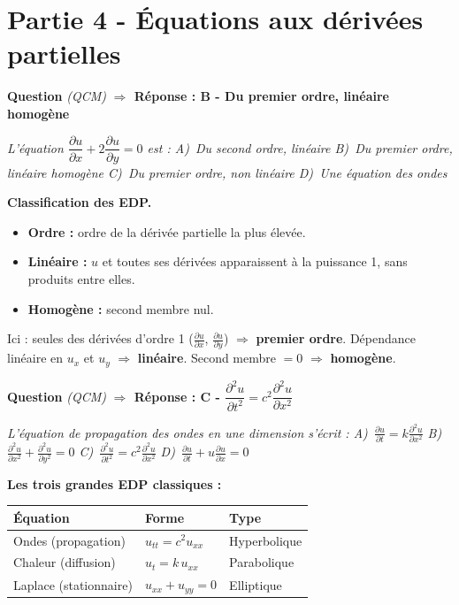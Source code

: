 \documentclass[11pt,a4paper]{article}
\newcounter{qnum}
\newcommand{\qtitre}[2]{%
  \stepcounter{qnum}%
  \medskip\noindent
  \textbf{\color{bleutexte}Question \theqnum}\enspace
  \textit{(#1)}\enspace
  \textcolor{vertok}{\textbf{$\Rightarrow$ Réponse : #2}}
  \par\smallskip
}
\newcommand{\qenonce}[1]{%
  \begin{mdframed}[backgroundcolor=grisbox, linewidth=0pt,
    innerleftmargin=8pt, innerrightmargin=8pt,
    innertopmargin=5pt, innerbottommargin=5pt,
    skipabove=2pt, skipbelow=4pt]
  \small\textit{#1}
  \end{mdframed}
}
\begin{document}
\section{Partie 4 - Équations aux dérivées partielles}

\qtitre{QCM}{B - Du premier ordre, linéaire homogène}
\qenonce{L'équation $\dfrac{\partial u}{\partial x} + 2\dfrac{\partial u}{\partial y} = 0$ est :
\quad A)~Du second ordre, linéaire
\quad B)~Du premier ordre, linéaire homogène
\quad C)~Du premier ordre, non linéaire
\quad D)~Une équation des ondes}

\begin{methodebox}
\textbf{Classification des EDP.}
\begin{itemize}[itemsep=1pt, topsep=2pt]
  \item \textbf{Ordre :} ordre de la dérivée partielle la plus élevée.
  \item \textbf{Linéaire :} $u$ et toutes ses dérivées apparaissent à la puissance 1, sans produits entre elles.
  \item \textbf{Homogène :} second membre nul.
\end{itemize}
\end{methodebox}

Ici : seules des dérivées d'ordre 1 ($\frac{\partial u}{\partial x}$, $\frac{\partial u}{\partial y}$) $\Rightarrow$ \textbf{premier ordre}. Dépendance linéaire en $u_x$ et $u_y$ $\Rightarrow$ \textbf{linéaire}. Second membre $= 0$ $\Rightarrow$ \textbf{homogène}.

\qtitre{QCM}{C - $\dfrac{\partial^2 u}{\partial t^2} = c^2\dfrac{\partial^2 u}{\partial x^2}$}
\qenonce{L'équation de propagation des ondes en une dimension s'écrit :
\quad A)~$\frac{\partial u}{\partial t} = k\frac{\partial^2 u}{\partial x^2}$
\quad B)~$\frac{\partial^2 u}{\partial x^2}+\frac{\partial^2 u}{\partial y^2}=0$
\quad C)~$\frac{\partial^2 u}{\partial t^2}=c^2\frac{\partial^2 u}{\partial x^2}$
\quad D)~$\frac{\partial u}{\partial t}+u\frac{\partial u}{\partial x}=0$}

\begin{methodebox}
\textbf{Les trois grandes EDP classiques :}
\begin{center}
\begin{tabular}{@{}lll@{}}
\toprule
Équation & Forme & Type \\
\midrule
Ondes (propagation) & $u_{tt} = c^2 u_{xx}$ & Hyperbolique \\
Chaleur (diffusion) & $u_t = k\,u_{xx}$ & Parabolique \\
Laplace (stationnaire) & $u_{xx}+u_{yy}=0$ & Elliptique \\
\bottomrule
\end{tabular}
\end{center}
\end{methodebox}
\end{document}
